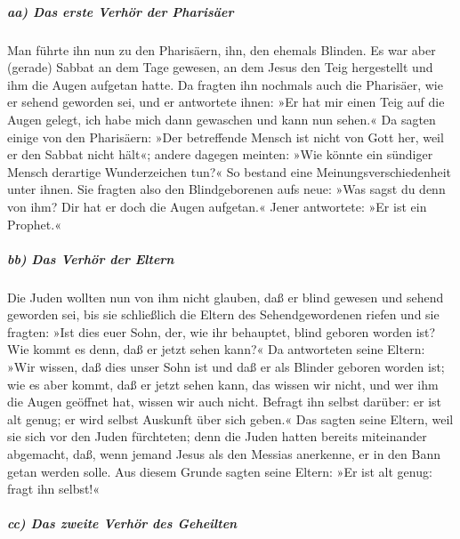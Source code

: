 \hypertarget{aa-das-erste-verhuxf6r-der-pharisuxe4er}{%
\subparagraph{aa) Das erste Verhör der
Pharisäer}\label{aa-das-erste-verhuxf6r-der-pharisuxe4er}}

 Man führte ihn nun zu den Pharisäern, ihn, den ehemals
Blinden.  Es war aber (gerade) Sabbat an dem Tage
gewesen, an dem Jesus den Teig hergestellt und ihm die Augen aufgetan
hatte.  Da fragten ihn nochmals auch die Pharisäer, wie
er sehend geworden sei, und er antwortete ihnen: »Er hat mir einen Teig
auf die Augen gelegt, ich habe mich dann gewaschen und kann nun sehen.«
 Da sagten einige von den Pharisäern: »Der betreffende
Mensch ist nicht von Gott her, weil er den Sabbat nicht hält«; andere
dagegen meinten: »Wie könnte ein sündiger Mensch derartige Wunderzeichen
tun?« So bestand eine Meinungsverschiedenheit unter ihnen.
 Sie fragten also den Blindgeborenen aufs neue: »Was
sagst du denn von ihm? Dir hat er doch die Augen aufgetan.« Jener
antwortete: »Er ist ein Prophet.«

\hypertarget{bb-das-verhuxf6r-der-eltern}{%
\subparagraph{bb) Das Verhör der
Eltern}\label{bb-das-verhuxf6r-der-eltern}}

 Die Juden wollten nun von ihm nicht glauben, daß er
blind gewesen und sehend geworden sei, bis sie schließlich die Eltern
des Sehendgewordenen riefen  und sie fragten: »Ist dies
euer Sohn, der, wie ihr behauptet, blind geboren worden ist? Wie kommt
es denn, daß er jetzt sehen kann?«  Da antworteten seine
Eltern: »Wir wissen, daß dies unser Sohn ist und daß er als Blinder
geboren worden ist;  wie es aber kommt, daß er jetzt
sehen kann, das wissen wir nicht, und wer ihm die Augen geöffnet hat,
wissen wir auch nicht. Befragt ihn selbst darüber: er ist alt genug; er
wird selbst Auskunft über sich geben.«  Das sagten seine
Eltern, weil sie sich vor den Juden fürchteten; denn die Juden hatten
bereits miteinander abgemacht, daß, wenn jemand Jesus als den Messias
anerkenne, er in den Bann getan werden solle.  Aus diesem
Grunde sagten seine Eltern: »Er ist alt genug: fragt ihn selbst!«

\hypertarget{cc-das-zweite-verhuxf6r-des-geheilten}{%
\subparagraph{cc) Das zweite Verhör des
Geheilten}\label{cc-das-zweite-verhuxf6r-des-geheilten}}

